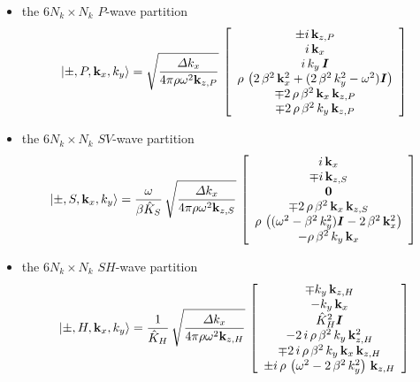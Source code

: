 \documentclass[11pt,a4paper]{article}
\newcommand{\bmi}[1]{\mbox{\boldmath$\mit #1$\unboldmath}}
\begin{document}
\begin{itemize}
\item the $6 N_k \times N_k$ $P$-wave partition
\begin{equation} \label{PeigenSuper}
\left|\pm,P, {\bf k}_x,k_{y}  \right\rangle=
\sqrt{\frac{{\mit \Delta} k_{x}}{{4 \pi \rho {\omega
}^{  2}{\bf  k}_{
z, P }}}}\,\left[\begin{array}{c} \pm i\,{\bf k}_{z,P}\\i\,{\bf k}_{x}\\
i\,k_{y}\,{\bmi I}\\
  \rho \,\left( 2\,{\beta^2}\,{{\bf k}_{x}^2} + ( 2\,{\beta^2}\,{k_{y}^2} -
     {\omega^2}){\bmi I} \right) \\ \mp 2\,\rho\,{\beta^2}\,{\bf k}_{x}\,{\bf k}_{z,P} \\
  \mp 2\,\rho\,{\beta^2}\,k_{y}\,{\bf k}_{z,P} \end{array}\right]
\end{equation}

\item  the $6 N_k \times N_k$ $SV$-wave partition
\begin{equation} \label{SVeigenSuper}
\left|\pm,S, {\bf k}_x,k_{y}  \right\rangle=\frac{\omega }{\beta \hat{K}_{S}}\,
\sqrt{\frac{{\mit \Delta} k_{x}}{{4 \pi \rho {\omega
}^{  2}{\bf  k}_{
z, S }}}}\,\left[\begin{array}{c}
i\,{\bf k}_{x}\\
\mp i\,{\bf k}_{z,S}\\ {\bf 0} \\
\mp 2\,\rho\,{\beta^2}\,{\bf k}_{x}\,{\bf k}_{z,S} \\
  \rho \,\left(({\omega^2} - {\beta^2}\,{k_{y}^2}) {\bmi I}-2\,{\beta^2}\,{{\bf k}_{x}^2}   \right) \\
  -\rho\,{\beta^2}\,k_{y}\,{\bf k}_{x} \end{array}\right]
\end{equation}

\item the $6 N_k \times N_k$ $SH$-wave partition
\begin{equation} \label{SHeigenSuper}
\left|\pm,H, {\bf k}_x, k_{y}  \right\rangle=\frac{1 }{\hat{K}_{H}}\,
\sqrt{\frac{{\mit \Delta} k_{x}}{{4 \pi \rho {\omega
}^{  2}{\bf  k}_{
z, H }}}}\,\left[\begin{array}{c}
\mp k_{y}\,{\bf k}_{z,H} \\-k_{y}\,{\bf k}_{x} \\
  \hat{K}_{H}^2 {\bmi I}\\
-2\,i\,\rho \,{\beta^2}\,k_{y}\,{{\bf k}_{z,H}^2}\\
  \mp 2\,i\,\rho\,{\beta^2}\,k_{y}\,{\bf k}_{x}\,{\bf k}_{z,H} \\
  \pm i\,\rho\,\left(  {\omega^2} -2\,{\beta^2}\,{k_{y}^2}
  \right)\,{\bf k}_{z,H}  \end{array}\right]
\end{equation}

\end{itemize}
\end{document}
